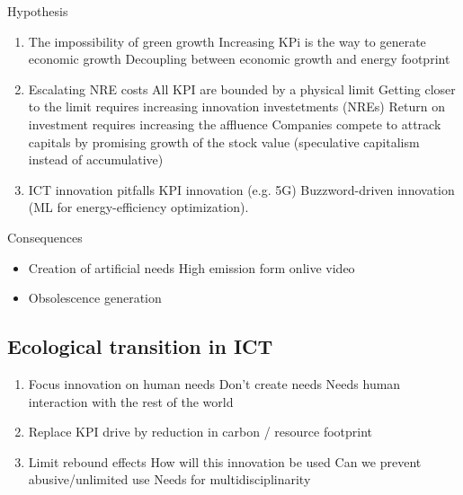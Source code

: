 \bigbreak
Hypothesis
\begin{enumerate}
  \item The impossibility of green growth
    \subitem Increasing KPi is the way to generate economic growth
    \subitem Decoupling between economic growth and energy footprint
  \item Escalating NRE costs
    \subitem All KPI are bounded by a physical limit
    \subitem Getting closer to the limit requires increasing innovation investetments (NREs)
    \subitem Return on investment requires increasing the affluence
    \subitem Companies compete to attrack capitals by promising growth of the stock value (speculative capitalism instead of accumulative)
  \item ICT innovation pitfalls
    \subitem KPI innovation (e.g. 5G)
    \subitem Buzzword-driven innovation (ML for energy-efficiency optimization).
\end{enumerate}


Consequences
\begin{itemize}
  \item Creation of artificial needs
  \subitem High emission form onlive video
  \item Obsolescence generation
\end{itemize}



\subsection{Ecological transition in ICT}
\begin{enumerate}
  \item Focus innovation on human needs
    \subitem Don't create needs
    \subitem Needs human interaction with the rest of the world
  \item Replace KPI drive by reduction in carbon / resource footprint
  \item Limit rebound effects
    \subitem How will this innovation be used
    \subitem Can we prevent abusive/unlimited use 
    \subitem Needs for multidisciplinarity
\end{enumerate}




